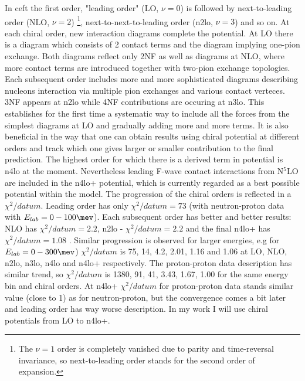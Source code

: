 In \gls{ceft} the first order, "leading order" (LO, $\nu=0$) is followed 
by next-to-leading order (NLO, $\nu=2$)
\footnote{The $\nu=1$ order is completely vanished due to parity and time-reversal invariance,
so next-to-leading order stands for the second order of expansion.},
 next-to-next-to-leading order (\gls{n2lo}, $\nu=3$) and so on.
 At each chiral order, new interaction diagrams complete the potential.
 At LO there is a diagram which consists of 2 contact terms and the diagram
 implying one-pion exchange. Both diagrams reflect only 2NF as well
 as diagrams at NLO, where more contact terms are introduced together with two-pion 
 exchange topologies. Each subsequent order includes more and more sophisticated diagrams
 describing nucleons interaction
 via multiple  pion exchanges and various contact verteces.
 3NF appears at \gls{n2lo} while 4NF contributions are occuring at \gls{n3lo}.
 This establishes for the first time a systematic
way to include all the forces from the simplest diagrams at LO and gradually
adding more and more terms. 
It is also beneficial in the way that 
one can obtain results using chiral potential at different
orders and track which one gives larger or smaller contribution to the final prediction.
The highest order for which there is a derived term in potential
is \gls{n4lo} at the moment. Nevertheless leading F-wave contact interactions from N$^5$LO are included in the \gls{n4lo+} potential,
which is currently regarded as a best possible potential within the model.
The progression of the chiral orders is reflected in a $\chi^2/datum$.
Leading order has only $\chi^2/datum = 73$ (with neutron-proton data with $E_{lab} = 0-100 \unit{\mev}$).
Each subsequent order has better and better results: NLO has $\chi^2/datum = 2.2$, \gls{n2lo} - $\chi^2/datum = 2.2$
and the final \gls{n4lo+} has $\chi^2/datum = 1.08$ \cite{reinkrebs2018}.
Similar progression is observed for larger energies, e.g for $E_{lab} = 0-300 \unit{\mev}$)
$\chi^2/datum$ is 75, 14, 4.2, 2.01, 1.16 and 1.06 at LO, NLO, \gls{n2lo}, \gls{n3lo}, \gls{n4lo} and \gls{n4lo+} respectively.
The proton-proton data description has similar trend, so $\chi^2/datum$ is 1380, 91, 41, 3.43, 1.67, 1.00 
for the same energy bin and chiral orders. At \gls{n4lo+} $\chi^2/datum$ for proton-proton data
stands similar value (close to 1) as for neutron-proton, but the convergence comes a bit later and 
leading order has way worse description.
In my work I will use chiral potentials from LO to \gls{n4lo+}.

